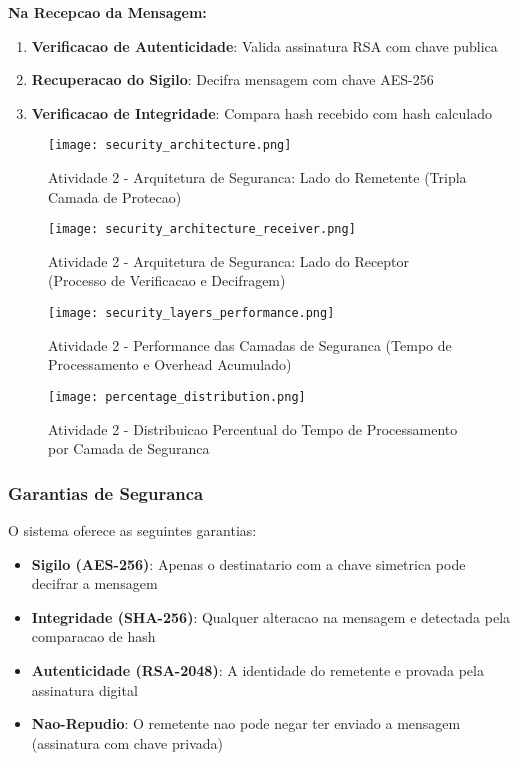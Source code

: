 \documentclass[12pt,a4paper,oneside]{article}
\begin{document}
\textbf{Na Recepcao da Mensagem:}
\begin{enumerate}
    \item \textbf{Verificacao de Autenticidade}: Valida assinatura RSA com chave publica
    \item \textbf{Recuperacao do Sigilo}: Decifra mensagem com chave AES-256
    \item \textbf{Verificacao de Integridade}: Compara hash recebido com hash calculado
\end{enumerate}

\begin{figure}[H]
\centering
\texttt{[image: security\_architecture.png]}
\caption{Atividade 2 - Arquitetura de Seguranca: Lado do Remetente (Tripla Camada de Protecao)}
\label{fig:security_arch_sender}
\end{figure}

\begin{figure}[H]
\centering
\texttt{[image: security\_architecture\_receiver.png]}
\caption{Atividade 2 - Arquitetura de Seguranca: Lado do Receptor (Processo de Verificacao e Decifragem)}
\label{fig:security_arch_receiver}
\end{figure}

\begin{figure}[H]
\centering
\texttt{[image: security\_layers\_performance.png]}
\caption{Atividade 2 - Performance das Camadas de Seguranca (Tempo de Processamento e Overhead Acumulado)}
\label{fig:security_perf}
\end{figure}

\begin{figure}[H]
\centering
\texttt{[image: percentage\_distribution.png]}
\caption{Atividade 2 - Distribuicao Percentual do Tempo de Processamento por Camada de Seguranca}
\label{fig:percentage_distribution}
\end{figure}

\subsubsection{Garantias de Seguranca}

O sistema oferece as seguintes garantias:

\begin{itemize}
    \item \textbf{Sigilo (AES-256)}: Apenas o destinatario com a chave simetrica pode decifrar a mensagem
    \item \textbf{Integridade (SHA-256)}: Qualquer alteracao na mensagem e detectada pela comparacao de hash
    \item \textbf{Autenticidade (RSA-2048)}: A identidade do remetente e provada pela assinatura digital
    \item \textbf{Nao-Repudio}: O remetente nao pode negar ter enviado a mensagem (assinatura com chave privada)
\end{itemize}
\end{document}
